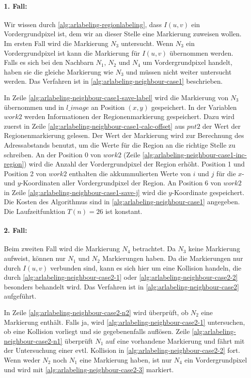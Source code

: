 \paragraph{1. Fall:} %
\label{par:fall_1_}
Wir wissen durch \autoref{alg:arlabeling-regionlabeling}, dass $I(u,v)$ ein Vordergrundpixel ist, dem wir an dieser
 Stelle eine Markierung zuweisen wollen. Im ersten Fall wird die Markierung $N_3$ untersucht. Wenn $N_3$ ein
 Vordergrundpixel ist kann die Markierung für $I(u,v)$ übernommen werden. Falls es sich bei den Nachbarn
 $N_1$, $N_2$ und $N_4$ um Vordergrundpixel handelt, haben sie die gleiche Markierung wie $N_3$ und müssen nicht weiter
 untersucht werden. Das Verfahren ist in
 \autoref{alg:arlabeling-neighbour-case1} beschrieben.

In Zeile \ref{alg:arlabeling-neighbour-case1-save-label} wird die Markierung von $N_3$ übernommen und in
 $\mathit{l\_image}$ an Position $(x,y)$ gespeichert. In der Variablen $\mathit{work2}$ werden Informationen der
 Regionenmarkierung gespeichert. Dazu wird zuerst in Zeile \ref{alg:arlabeling-neighbour-case1-calc-offset} aus
 $\mathit{pnt2}$ der Wert der Regionenmarkierung gelesen. Der Wert der Markierung wird zur Berechnung des
 Adressabstands benutzt, um die Werte für die Region an die richtige Stelle zu schreiben. An der Position $0$ von
 $\mathit{work2}$ (Zeile \ref{alg:arlabeling-neighbour-case1-inc-region}) wird die Anzahl der Vordergrundpixel der
 Region erhöht. Position 1 und Position 2 von $\mathit{work2}$ enthalten die akkummulierten Werte von $i$ und $j$ für
 die $x$- und $y$-Koordinaten aller Vordergrundpixel der Region. An Position 6 von $\mathit{work2}$ in Zeile
 \ref{alg:arlabeling-neighbour-case1-save-j} wird die $y$-Koordinate gespeichert. Die Kosten des Algorithmus sind in
 \autoref{alg:arlabeling-neighbour-case1} angegeben. Die Laufzeitfunktion $T(n) = 26$ ist konstant.

\paragraph{2. Fall:} %
\label{par:fall_2_}
Beim zweiten Fall wird die Markierung $N_4$ betrachtet. Da $N_3$ keine Markierung aufweist, können nur $N_1$ und $N_2$
 Markierungen haben. Da die Markierungen nur durch $I(u,v)$ verbunden sind, kann es sich hier um eine Kollision
 handeln, die durch \autoref{alg:arlabeling-neighbour-case2-1} oder \autoref{alg:arlabeling-neighbour-case2-2}
 besonders behandelt wird. Das Verfahren ist in \autoref{alg:arlabeling-neighbour-case2} aufgeführt.

In Zeile \ref{alg:arlabeling-neighbour-case2-n2} wird überprüft, ob $N_2$ eine Markierung enthält. Falls ja, wird
 \autoref{alg:arlabeling-neighbour-case2-1} untersuchen, ob eine Kollision vorliegt und sie gegebenenfalls auflösen.
 Zeile \ref{alg:arlabeling-neighbour-case2-n1} überprüft $N_1$ auf eine vorhandene Markierung und fährt mit der
 Untersuchung einer evtl. Kollision in \autoref{alg:arlabeling-neighbour-case2-2} fort. Wenn weder $N_2$ noch $N_1$
 eine Markierung haben, ist nur $N_4$ ein Vordergrundpixel und wird mit \autoref{alg:arlabeling-neighbour-case2-3}
 markiert.

